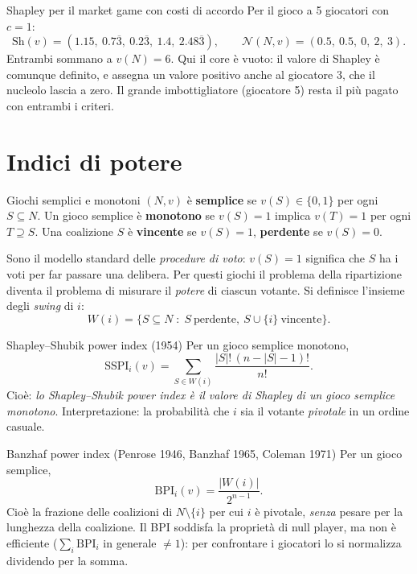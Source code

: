 \documentclass[12pt,a4paper,twoside]{book}
\theoremstyle{plain}
\theoremstyle{definition}
\newcommand{\Sh}{\mathrm{Sh}}
\begin{document}
\begin{exbox}{Shapley per il market game con costi di accordo}
Per il gioco a 5 giocatori con $c=1$:
\[
  \Sh(v)=(1.15,\ 0.7\overline{3},\ 0.2\overline{3},\ 1.4,\ 2.48\overline{3}),
  \qquad \mathcal{N}(N,v)=(0.5,\ 0.5,\ 0,\ 2,\ 3).
\]
Entrambi sommano a $v(N)=6$. Qui il core è vuoto: il valore di Shapley è comunque
definito, e assegna un valore positivo anche al giocatore 3, che il nucleolo
lascia a zero. Il grande imbottigliatore (giocatore 5) resta il più pagato con
entrambi i criteri.
\end{exbox}

\section{Indici di potere}

\begin{defbox}{Giochi semplici e monotoni}
$(N,v)$ è \textbf{semplice} se $v(S)\in\{0,1\}$ per ogni $S\subseteq N$.
Un gioco semplice è \textbf{monotono} se $v(S)=1$ implica $v(T)=1$ per ogni
$T\supseteq S$. Una coalizione $S$ è \textbf{vincente} se $v(S)=1$,
\textbf{perdente} se $v(S)=0$.
\end{defbox}

Sono il modello standard delle \emph{procedure di voto}: $v(S)=1$ significa che
$S$ ha i voti per far passare una delibera. Per questi giochi il problema della
ripartizione diventa il problema di misurare il \emph{potere} di ciascun votante.
Si definisce l'insieme degli \emph{swing} di $i$:
\[
  W(i)=\{S\subseteq N\;:\;S\ \text{perdente},\ S\cup\{i\}\ \text{vincente}\}.
\]

\begin{defbox}{Shapley--Shubik power index (1954)}
Per un gioco semplice monotono,
\[
  \mathrm{SSPI}_i(v)=\sum_{S\in W(i)}\frac{|S|!\,(n-|S|-1)!}{n!}.
\]
Cioè: \emph{lo Shapley--Shubik power index è il valore di Shapley di un gioco
semplice monotono}. Interpretazione: la probabilità che $i$ sia il votante
\emph{pivotale} in un ordine casuale.
\end{defbox}

\begin{defbox}{Banzhaf power index (Penrose 1946, Banzhaf 1965, Coleman 1971)}
Per un gioco semplice,
\[
  \mathrm{BPI}_i(v)=\frac{|W(i)|}{2^{n-1}} .
\]
Cioè la frazione delle coalizioni di $N\setminus\{i\}$ per cui $i$ è pivotale,
\emph{senza} pesare per la lunghezza della coalizione. Il BPI soddisfa la
proprietà di null player, ma non è efficiente ($\sum_i\mathrm{BPI}_i$ in
generale $\ne 1$): per confrontare i giocatori lo si normalizza dividendo per la
somma.
\end{defbox}
\end{document}
